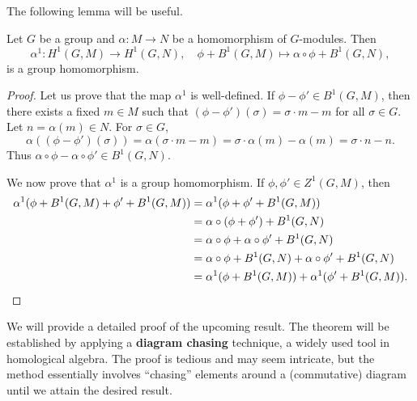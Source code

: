 The following lemma will be useful. 

\begin{lemma}
\label{lem:H1_maps}
    Let $G$ be a group and 
    $\alpha\colon M\to N$ be a homomorphism of $G$-modules. 
    Then 
    \[
    \alpha^1\colon H^1(G,M)\to H^1(G,N),\quad 
    \phi+B^1(G,M)\mapsto \alpha\circ\phi+B^1(G,N),
    \]
    is a group homomorphism. 
\end{lemma}

\begin{proof}
    Let us prove that the map $\alpha^1$ is well-defined. If 
    $\phi-\phi'\in B^1(G,M)$, then 
    there exists a fixed 
    $m\in M$ such that 
    $(\phi-\phi')(\sigma)=\sigma\cdot m-m$ for all $\sigma\in G$. 
    Let $n=\alpha(m)\in N$. 
    For $\sigma\in G$, 
    \[
    \alpha((\phi-\phi')(\sigma))=\alpha(\sigma\cdot m-m)
    =\sigma\cdot \alpha(m)-\alpha(m)=\sigma\cdot n-n. 
    \]
    Thus $\alpha\circ\phi-\alpha\circ\phi'\in B^1(G,N)$. 

    We now prove that $\alpha^1$ is a group homomorphism. If 
    $\phi,\phi'\in Z^1(G,M)$, then 
    \begin{align*}
    \alpha^1(\phi+B^1(G,M)+\phi'+B^1(G,M))
    &=\alpha^1(\phi+\phi'+B^1(G,M))\\
    &=\alpha\circ(\phi+\phi')+B^1(G,N)\\
    &=\alpha\circ\phi+\alpha\circ\phi'+B^1(G,N)\\
    &=\alpha\circ\phi+B^1(G,N)+\alpha\circ\phi'+B^1(G,N)\\
    &=\alpha^1(\phi+B^1(G,M))+\alpha^1(\phi'+B^1(G,M)).\qedhere
    \end{align*}
\end{proof}

We will provide a detailed proof of the upcoming result. 
The theorem will be established by applying a \textbf{diagram chasing} technique, a widely used tool in homological algebra.
The proof is tedious and may seem intricate, but the method essentially 
involves ``chasing'' elements around a (commutative) diagram until we attain the desired result. 

